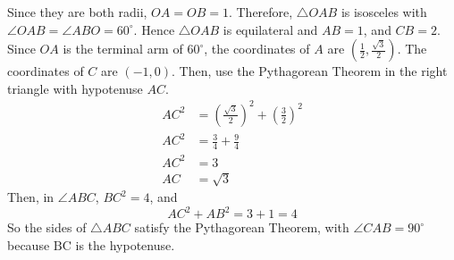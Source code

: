 \documentclass[12pt,fleqn]{book}
\newcommand{\sol}[1]{\begin{Answer}\parbox[t]{\textwidth-5em}{#1}\end{Answer}}
\begin{document}
\sol{
Since they are both radii, $OA=OB=1$.  Therefore, $\triangle OAB$ is isosceles with $\angle OAB=\angle ABO=60^{\circ}$. Hence $\triangle OAB$ is equilateral and $AB=1$, and $CB=2$.
\\[1em]
Since $OA$ is the terminal arm of $60^{\circ}$, the coordinates of $A$ are $\left(\frac{1}{2}, \frac{\sqrt{3}}{2}\right)$. The coordinates of $C$ are $(-1,0)$. Then, use the Pythagorean Theorem in the right triangle with hypotenuse $AC$.
\begin{align*}
	AC^2 & =\left(\frac{\sqrt{3}}{2}\right)^2+\left(\frac{3}{2}\right)^2 \\
	AC^2 & =\frac{3}{4}+\frac{9}{4}                                      \\
	AC^2 & =3                                                            \\
	AC   & =\sqrt{3}
\end{align*}
Then, in $\angle ABC$, $BC^2=4$, and
\[
	AC^2+AB^2 =3+1=4
\]
So the sides of $\triangle ABC$ satisfy the Pythagorean Theorem, with $\angle CAB=90^{\circ}$ because $\mathrm{BC}$ is the hypotenuse.
}
\end{document}
